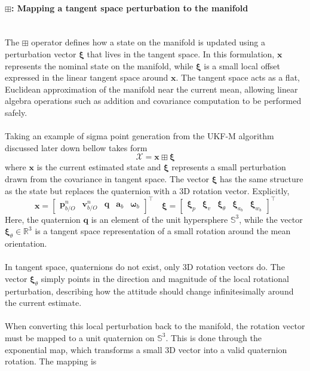 \paragraph{$\boxplus$: Mapping a tangent space perturbation to the manifold} \mbox{}\\[0.5em] \noindent
The $\boxplus$ operator defines how a state on the manifold is updated using a perturbation vector $\boldsymbol{\xi}$ that lives in the tangent space. In this formulation, $\mathbf{x}$ represents the nominal state on the manifold, while $\boldsymbol{\xi}$ is a small local offset expressed in the linear tangent space around $\mathbf{x}$. The tangent space acts as a flat, Euclidean approximation of the manifold near the current mean, allowing linear algebra operations such as addition and covariance computation to be performed safely.
\\ \\
Taking an example of sigma point generation from the UKF-M algorithm discussed later down bellow takes form
$$
    \mathcal{X} = \mathbf{x} \boxplus \boldsymbol{\xi}
$$
where $\mathbf{x}$ is the current estimated state and $\boldsymbol{\xi}$ represents a small perturbation drawn from the covariance in tangent space. The vector $\boldsymbol{\xi}$ has the same structure as the state but replaces the quaternion with a 3D rotation vector. Explicitly,
$$
    \mathbf{x} =
    \begin{bmatrix}
        \mathbf{p}_{b/O}^{n} & \mathbf{v}_{b/O}^{n} & \mathbf{q} & \mathbf{a}_b & \mathbf{\omega}_b
    \end{bmatrix}^\top \quad
    \boldsymbol{\xi} =
    \begin{bmatrix}
        \boldsymbol{\xi}_{p} & \boldsymbol{\xi}_{v} & \boldsymbol{\xi}_{\theta} & \boldsymbol{\xi}_{a_b} & \boldsymbol{\xi}_{w_b}
    \end{bmatrix}^\top
$$
Here, the quaternion $\mathbf{q}$ is an element of the unit hypersphere $\mathbb{S}^3$, while the vector $\boldsymbol{\xi}_{\theta} \in \mathbb{R}^3$ is a tangent space representation of a small rotation around the mean orientation.
\\ \\
In tangent space, quaternions do not exist, only 3D rotation vectors do. The vector $\boldsymbol{\xi}_{\theta}$ simply points in the direction and magnitude of the local rotational perturbation, describing how the attitude should change infinitesimally around the current estimate.
\\ \\
When converting this local perturbation back to the manifold, the rotation vector must be mapped to a unit quaternion on $\mathbb{S}^3$. This is done through the exponential map, which transforms a small 3D vector into a valid quaternion rotation. The mapping is
